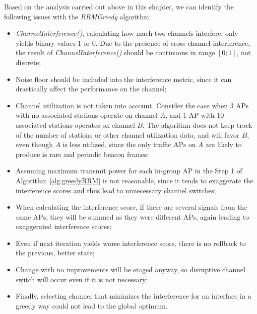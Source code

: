 Based on the analysis carried out above in this chapter, we can identify the following issues with the \textit{RRMGreedy} algorithm:
\begin{itemize}
    \item \textit{ChannelInterference()}, calculating how much two channels interfere, only yields binary values 1 or 0. Due to the presence of cross-channel interference, the result of \textit{ChannelInterference()} should be continuous in range $[0; 1]$, not discrete;
    \item Noise floor should be included into the interference metric, since it can drastically affect the performance on the channel;
    \item Channel utilization is not taken into account. Consider the case when 3 APs with no associated stations operate on channel $A$, and 1 AP with 10 associated stations operates on channel $B$. The algorithm does not keep track of the number of stations or other channel utilization data, and will favor $B$, even though $A$ is less utilized, since the only traffic APs on $A$ are likely to produce is rare and periodic beacon frames;
    \item Assuming maximum transmit power for each in-group AP in the Step 1 of Algorithm \ref{alg:greedyRRM} is not reasonable, since it tends to exaggerate the interference scores and thus lead to unnecessary channel switches;
    \item When calculating the interference score, if there are several signals from the same APs, they will be summed as they were different APs, again leading to exaggerated interference scores;
    \item Even if next iteration yields worse interference score, there is no rollback to the previous, better state;
    \item Change with no improvements will be staged anyway, so disruptive channel switch will occur even if it is not necessary;
    \item Finally, selecting channel that minimizes the interference for an interface in a greedy way could not lead to the global optimum.
\end{itemize}


